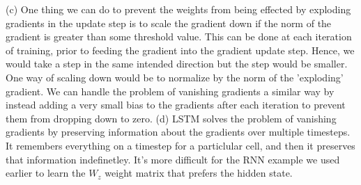 \documentclass[12pt]{article}
\begin{document}
(c)  One thing we can do to prevent the weights from being effected by exploding gradients in the update step is to scale the gradient down if the norm of the gradient is greater than some threshold value. This can be done at each iteration of training, prior to feeding the gradient into the gradient update step. Hence, we would take a step in the same intended direction but the step would be smaller. One way of scaling down would be to normalize by the norm of the 'exploding' gradient. We can handle the problem of vanishing gradients a similar way by instead adding a very small bias to the gradients after each iteration to prevent them from dropping down to zero.  \newline \newline 
(d) LSTM solves the problem of vanishing gradients by preserving information about the gradients over multiple timesteps.  It remembers everything on a timestep for a particlular cell, and then it preserves that information indefinetley. It's more difficult for the RNN example we used earlier to learn the $W_z$ weight matrix that prefers the hidden state.\newline\newline  
\end{document}
